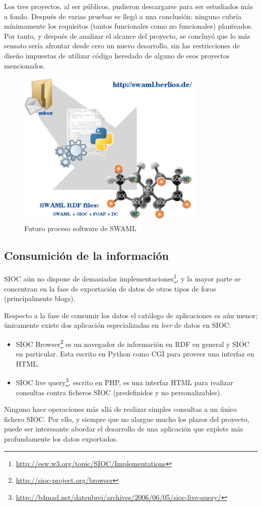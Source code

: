 Los tres proyectos, al ser públicos, pudieron descargarse para ser estudiados más a fondo. Después
de varias pruebas se llegó a una conclusión: ninguno cubría mínimamente los requisitos (tantos 
funcionales como no funcionales) planteados. Por tanto, y después de analizar el alcance del
proyecto, se concluyó que lo más sensato sería afrontar desde cero un nuevo desarrollo, sin las 
restricciones de diseño impuestas de utilizar código heredado de alguno de esos proyectos 
mencionados.

\begin{figure}[H]
	\centering
	\includegraphics[width=9cm]{images/swaml-process.png}
	\caption{Futuro proceso software de SWAML}
	\label{fig:swamlProcess}
\end{figure}


\subsection{Consumición de la información}

SIOC aún no dispone de demasiadas implementaciones\footnote{\url{http://esw.w3.org/topic/SIOC/Implementations}},
y la mayor parte se concentran en la fase de exportación de datos de otros
tipos de foros (principalmente blogs). 

Respecto a la fase de consumir los datos el catálogo de aplicaciones es aún 
menor; únicamente existe dos aplicación especializadas en \emph{leer} de datos 
en SIOC:

\begin{itemize}
  \item SIOC Browser\footnote{\url{http://sioc-project.org/browser}} es un 
	navegador de información en RDF en general y SIOC en particular. 
	Esta escrito en Python como CGI para proveer una interfaz en HTML.
  \item SIOC live query\footnote{\url{http://b4mad.net/datenbrei/archives/2006/06/05/sioc-live-query/}},
	escrito en PHP, es una interfaz HTML para realizar consultas
	contra ficheros SIOC (predefinidos y no personalizables).
\end{itemize}

Ninguno hace operaciones más allá de realizar simples consultas a un único fichero 
SIOC. Por ello, y siempre que no alargue mucho los plazos del proyecto, puede ser 
interesante abordar el desarrollo de una aplicación que explote más profundamente
los datos exportados.
